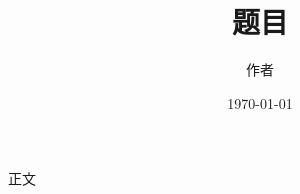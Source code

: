 \documentclass[a4paper,12pt,twoside]{article}
\title{题目}
\author{作者}
\date{\today}
\begin{document}
\maketitle
\tableofcontents
正文
%
\end{document}
